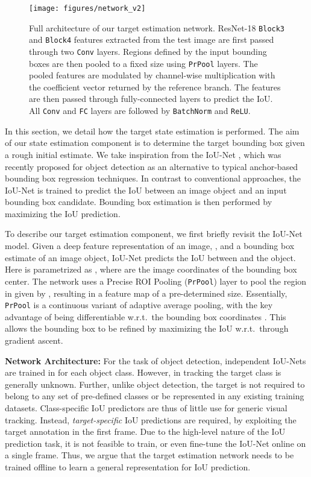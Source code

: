 \documentclass[10pt,twocolumn,letterpaper]{article}
\newcommand{\parsection}[1]{\noindent\textbf{#1:} }
\begin{document}
\begin{figure*}[t]
	\centering \newcommand{\wid}{0.9\textwidth}\texttt{[image: figures/network\_v2]}\caption{Full architecture of our target estimation network. ResNet-18 \texttt{Block3} and \texttt{Block4} features extracted from the test image are first passed through two \texttt{Conv} layers. Regions defined by the input bounding boxes are then pooled to a fixed size using \texttt{PrPool} layers. The pooled features are modulated by channel-wise multiplication with the coefficient vector returned by the reference branch. The features are then passed through fully-connected layers to predict the IoU. All \texttt{Conv} and \texttt{FC} layers are followed by \texttt{BatchNorm} and \texttt{ReLU}.
		}\label{fig:iou-network}\vspace{-3mm}
\end{figure*}

In this section, we detail how the target state estimation is performed. The aim of our state estimation component is to determine the target bounding box given a rough initial estimate.
We take inspiration from the IoU-Net \cite{IOUNet}, which was recently proposed for object detection as an alternative to typical anchor-based bounding box regression techniques. In contrast to conventional approaches, the IoU-Net is trained to predict the IoU between an image object and an input bounding box candidate. Bounding box estimation is then performed by maximizing the IoU prediction. 

To describe our target estimation component, we first briefly revisit the IoU-Net model. Given a deep feature representation of an image, , and a bounding box estimate  of an image object, IoU-Net predicts the IoU between  and the  object. Here  is parametrized as , where  are the image coordinates of the bounding box center. The network uses a Precise ROI Pooling (\verb|PrPool|) \cite{IOUNet} layer to pool the region in  given by , resulting in a feature map  of a pre-determined size. Essentially, \verb|PrPool| is a continuous variant of adaptive average pooling, with the key advantage of being differentiable w.r.t.\ the bounding box coordinates . This allows the bounding box  to be refined by maximizing the IoU w.r.t.\  through gradient ascent. 


\parsection{Network Architecture}
For the task of object detection, independent IoU-Nets are trained in \cite{IOUNet} for each object class.
However, in tracking the target class is generally unknown. Further, unlike object detection, the target is not required to belong to any set of pre-defined classes or be represented in any existing training datasets. Class-specific IoU predictors are thus of little use for generic visual tracking. Instead, \emph{target-specific} IoU predictions are required, by exploiting the target annotation in the first frame. Due to the high-level nature of the IoU prediction task, it is not feasible to train, or even fine-tune the IoU-Net online on a single frame. Thus, we argue that the target estimation network needs to be trained offline to learn a general representation for IoU prediction. 
\end{document}
